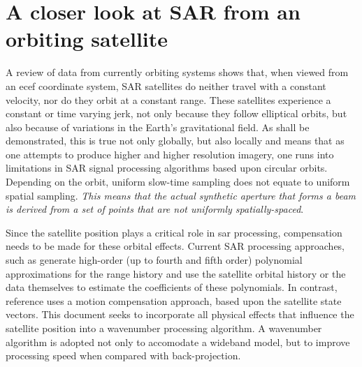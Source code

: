 \section{A closer look at SAR from an orbiting satellite}
A review of data from currently orbiting systems shows that, when viewed from an \gls{ecef} coordinate system,  SAR satellites do neither travel with a constant velocity, nor do they orbit at a constant range. These satellites experience a constant or time varying jerk, not only because they follow elliptical orbits, but also because of variations in the Earth's gravitational field. As shall be demonstrated, this is true not only globally, but also locally and means that as one attempts to produce higher and higher resolution imagery, one runs into limitations in SAR signal processing algorithms based upon circular orbits. Depending on the orbit, uniform slow-time sampling does not equate to uniform spatial sampling. {\em This means that the actual synthetic aperture that forms a beam is derived from a set of points that are not uniformly spatially-spaced}. 
\par
Since the satellite position plays a critical role in \gls{sar} processing, compensation needs to be made for these orbital effects. Current SAR processing approaches, such as \cite{Luo2014, Meng2018, Edelhust2017, Zhao2014, Wu2016, Wang2015} generate high-order (up to fourth and fifth order) polynomial approximations for the range history and use the satellite orbital history or the data themselves to estimate the coefficients of these polynomials. In contrast, reference \cite{Prats2014} uses a motion compensation approach, based upon the satellite state vectors. This document seeks to incorporate all physical effects that influence the satellite position into a wavenumber processing algorithm. A wavenumber algorithm is adopted not only to accomodate a wideband model, but to improve processing speed when compared with back-projection.

